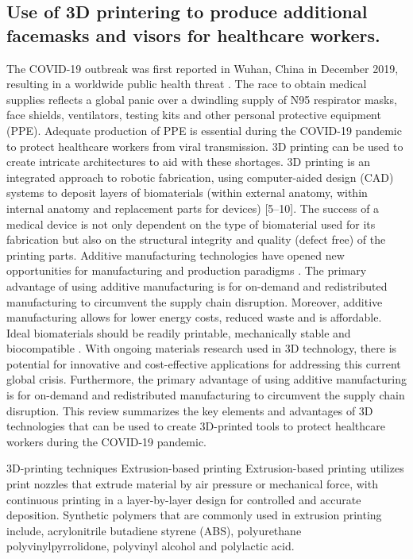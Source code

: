 \documentclass[12pt, letterpaper]{article}
\begin{document}
\begin{center}
\section{Use of 3D printering to produce additional facemasks and visors for healthcare workers.}
The COVID-19 outbreak was first reported in Wuhan, China in December 2019, resulting in a worldwide public health threat . The race to obtain medical supplies reflects a global panic over a dwindling supply of N95 respirator masks, face shields, ventilators, testing kits and other personal protective equipment (PPE). Adequate production of PPE is essential during the COVID-19 pandemic to protect healthcare workers from viral transmission. 3D printing can be used to create intricate architectures to aid with these shortages. 3D printing is an integrated approach to robotic fabrication, using computer-aided design (CAD) systems to deposit layers of biomaterials (within external anatomy, within internal anatomy and replacement parts for devices) [5–10]. The success of a medical device is not only dependent on the type of biomaterial used for its fabrication but also on the structural integrity and quality (defect free) of the printing parts. Additive manufacturing technologies have opened new opportunities for manufacturing and production paradigms . The primary advantage of using additive manufacturing is for on-demand and redistributed manufacturing to circumvent the supply chain disruption. Moreover, additive manufacturing allows for lower energy costs, reduced waste and is affordable. Ideal biomaterials should be readily printable, mechanically stable and biocompatible . With ongoing materials research used in 3D technology, there is potential for innovative and cost-effective applications for addressing this current global crisis. Furthermore, the primary advantage of using additive manufacturing is for on-demand and redistributed manufacturing to circumvent the supply chain disruption. This review summarizes the key elements and advantages of 3D technologies that can be used to create 3D-printed tools to protect healthcare workers during the COVID-19 pandemic.

3D-printing techniques
Extrusion-based printing
Extrusion-based printing utilizes print nozzles that extrude material by air pressure or mechanical force, with continuous printing in a layer-by-layer design for controlled and accurate deposition. Synthetic polymers that are commonly used in extrusion printing include, acrylonitrile butadiene styrene (ABS), polyurethane polyvinylpyrrolidone, polyvinyl alcohol and polylactic acid.


\end{center}
\end{document}
